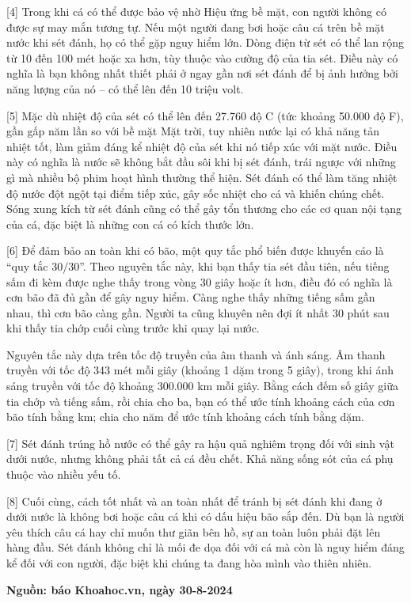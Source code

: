 \documentclass[12pt,a4paper,twoside]{article}
\newenvironment{readingpassage}[1][]{%
    \begin{tcolorbox}[enhanced, colback=grayLight, colframe=secondaryBlue,
        coltitle=textDark, fonttitle=\bfseries, title={#1},
        rounded corners, arc=3mm, boxrule=1pt,
        left=15pt, right=15pt, top=10pt, bottom=10pt,
        breakable, before skip=10pt, after skip=10pt, drop fuzzy shadow]
    \setstretch{1.3}
}{\end{tcolorbox}}
\begin{document}
\begin{readingpassage}[]
[4] Trong khi cá có thể được bảo vệ nhờ Hiệu ứng bề mặt, con người không có được sự may mắn tương tự. Nếu một người đang bơi hoặc câu cá trên bề mặt nước khi sét đánh, họ có thể gặp nguy hiểm lớn. Dòng điện từ sét có thể lan rộng từ 10 đến 100 mét hoặc xa hơn, tùy thuộc vào cường độ của tia sét. Điều này có nghĩa là bạn không nhất thiết phải ở ngay gần nơi sét đánh để bị ảnh hưởng bởi năng lượng của nó -- có thể lên đến 10 triệu volt.

[5] Mặc dù nhiệt độ của sét có thể lên đến 27.760 độ C (tức khoảng 50.000 độ F), gần gấp năm lần so với bề mặt Mặt trời, tuy nhiên nước lại có khả năng tản nhiệt tốt, làm giảm đáng kể nhiệt độ của sét khi nó tiếp xúc với mặt nước. Điều này có nghĩa là nước sẽ không bắt đầu sôi khi bị sét đánh, trái ngược với những gì mà nhiều bộ phim hoạt hình thường thể hiện. Sét đánh có thể làm tăng nhiệt độ nước đột ngột tại điểm tiếp xúc, gây sốc nhiệt cho cá và khiến chúng chết. Sóng xung kích từ sét đánh cũng có thể gây tổn thương cho các cơ quan nội tạng của cá, đặc biệt là những con cá có kích thước lớn.

[6] Để đảm bảo an toàn khi có bão, một quy tắc phổ biến được khuyến cáo là ``quy tắc 30/30''. Theo nguyên tắc này, khi bạn thấy tia sét đầu tiên, nếu tiếng sấm đi kèm được nghe thấy trong vòng 30 giây hoặc ít hơn, điều đó có nghĩa là cơn bão đã đủ gần để gây nguy hiểm. Càng nghe thấy những tiếng sấm gần nhau, thì cơn bão càng gần. Người ta cũng khuyên nên đợi ít nhất 30 phút sau khi thấy tia chớp cuối cùng trước khi quay lại nước.

Nguyên tắc này dựa trên tốc độ truyền của âm thanh và ánh sáng. Âm thanh truyền với tốc độ 343 mét mỗi giây (khoảng 1 dặm trong 5 giây), trong khi ánh sáng truyền với tốc độ khoảng 300.000 km mỗi giây. Bằng cách đếm số giây giữa tia chớp và tiếng sấm, rồi chia cho ba, bạn có thể ước tính khoảng cách của cơn bão tính bằng km; chia cho năm để ước tính khoảng cách tính bằng dặm.

[7] Sét đánh trúng hồ nước có thể gây ra hậu quả nghiêm trọng đối với sinh vật dưới nước, nhưng không phải tất cả cá đều chết. Khả năng sống sót của cá phụ thuộc vào nhiều yếu tố.

[8] Cuối cùng, cách tốt nhất và an toàn nhất để tránh bị sét đánh khi đang ở dưới nước là không bơi hoặc câu cá khi có dấu hiệu bão sắp đến. Dù bạn là người yêu thích câu cá hay chỉ muốn thư giãn bên hồ, sự an toàn luôn phải đặt lên hàng đầu. Sét đánh không chỉ là mối đe dọa đối với cá mà còn là nguy hiểm đáng kể đối với con người, đặc biệt khi chúng ta đang hòa mình vào thiên nhiên.

\hfill \textbf{Nguồn: báo Khoahoc.vn, ngày 30-8-2024}
\end{readingpassage}
\end{document}
